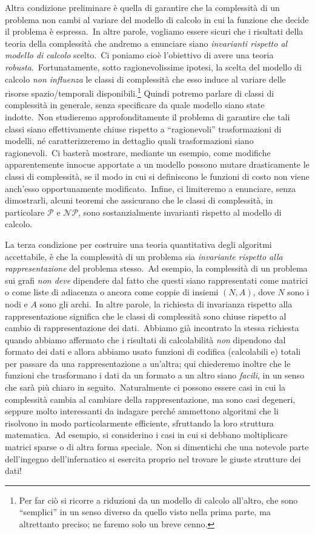 Altra condizione preliminare è quella di garantire che la complessità di un problema non cambi al variare del modello di calcolo in cui la funzione che decide il problema è espressa.\
In altre parole, vogliamo essere sicuri che i risultati della teoria della complessità che andremo a enunciare siano \textit{invarianti rispetto al modello di calcolo} scelto.\
Ci poniamo cioè l'obiettivo di avere una teoria \textit{robusta}.\
Fortunatamente, sotto ragionevolissime ipotesi, la scelta del modello di calcolo \textit{non influenza} le classi di complessità che esso induce al variare delle risorse spazio/temporali disponibili.\footnote{Per far ciò si ricorre a riduzioni da un modello di calcolo all'altro, che sono ``semplici'' in un senso diverso da quello visto nella prima parte, ma altrettanto preciso; ne faremo solo un breve cenno.}
Quindi potremo parlare di classi di complessità in generale, senza specificare da quale modello siano state indotte.\
Non studieremo approfonditamente il problema di garantire che tali classi siano effettivamente chiuse rispetto a ``ragionevoli'' trasformazioni di modelli, né caratterizzeremo in dettaglio quali trasformazioni siano ragionevoli.\
Ci basterà mostrare, mediante un esempio, come modifiche apparentemente innocue apportate a un modello possono mutare drasticamente le classi di complessità, se il modo in cui si definiscono le funzioni di costo non viene anch'esso opportunamente modificato.\
Infine, ci limiteremo a enunciare, senza dimostrarli, alcuni teoremi che assicurano che le classi di complessità, in particolare $\mathcal{P}$ e $\mathcal{NP}$, sono sostanzialmente invarianti rispetto al modello di calcolo.\

La terza condizione per costruire una teoria quantitativa degli algoritmi accettabile, è che la complessità di un problema sia \textit{invariante rispetto alla rappresentazione} del problema stesso.\
Ad esempio, la complessità di un problema sui grafi \textit{non deve} dipendere dal fatto che questi siano rappresentati come matrici o come liste di adiacenza o ancora come coppie di insiemi $(N, A)$, dove $N$ sono i nodi e $A$ sono gli archi.\
In altre parole, la richiesta di invarianza rispetto alla rappresentazione significa che le classi di complessità sono chiuse rispetto al cambio di rappresentazione dei dati.\
Abbiamo già incontrato la stessa richiesta quando abbiamo affermato che i risultati di calcolabilità \textit{non} dipendono dal formato dei dati e allora abbiamo usato funzioni di codifica (calcolabili e) totali per passare da una rappresentazione a un'altra; qui chiederemo inoltre che le funzioni che trasformano i dati da un formato a un altro siano \textit{facili}, in un senso che sarà più chiaro in seguito.\
Naturalmente ci possono essere casi in cui la complessità cambia al cambiare della rappresentazione, ma sono casi degeneri, seppure molto interessanti da indagare perché ammettono algoritmi che li risolvono in modo particolarmente efficiente, sfruttando la loro struttura matematica.\
Ad esempio, si considerino i casi in cui si debbano moltiplicare matrici sparse o di altra forma speciale.\
Non si dimentichi che una notevole parte dell'ingegno dell'infernatico si esercita proprio nel trovare le giuste strutture dei dati!

